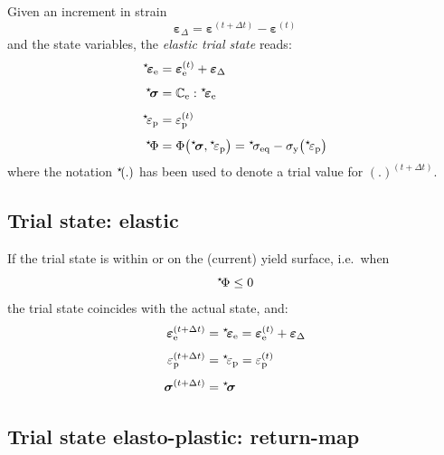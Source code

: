 \documentclass[times,namecite]{goose-article}
\newcommand\leftstar[1]{\hspace*{-.3em}~^\star\!#1}
\begin{document}
Given an increment in strain
\begin{equation}
  \bm{\varepsilon}_\Delta = \bm{\varepsilon}^{(t + \Delta t)} - \bm{\varepsilon}^{(t)}
  \label{eq:strain-increment}
\end{equation}
and the state variables, the \emph{elastic trial state} reads:
\begin{align}
  \leftstar{\bm{\varepsilon}}_\mathrm{e}
  &=
  \bm{\varepsilon}^{(t)}_\mathrm{e} + \bm{\varepsilon}_\Delta \label{eq:trial-strain}
  \\[1ex]
  \leftstar{\bm{\sigma}}
  &=
  \mathbb{C}_\mathrm{e} : \leftstar{\bm{\varepsilon}}_\mathrm{e}
  \\[1ex]
  \leftstar{\varepsilon}_\mathrm{p}
  &=
  \varepsilon_\mathrm{p}^{(t)}
  \\[1ex]
  \leftstar{\Phi}
  &= \Phi \big( \leftstar{\bm{\sigma}} , \leftstar{\varepsilon}_\mathrm{p} \big)
   = \leftstar{\sigma}_\mathrm{eq} - \sigma_\mathrm{y} \big( \leftstar{\varepsilon}_\mathrm{p} \big)
\end{align}
where the notation $\leftstar{(.)}$ has been used to denote a trial value for $(.)^{(t + \Delta t)}$.

\subsection{Trial state: elastic}

If the trial state is within or on the (current) yield surface, i.e.\ when
\begin{equation}
  \leftstar{\Phi} \leq 0
\end{equation}
the trial state coincides with the actual state, and:
\begin{align}
  \bm{\varepsilon}_\mathrm{e}^{(t+\Delta t)}
  &= \leftstar{\bm{\varepsilon}}_\mathrm{e}
   = \bm{\varepsilon}_\mathrm{e}^{(t)} + \bm{\varepsilon}_\Delta
  \\[1ex]
  \varepsilon_\mathrm{p}^{(t+\Delta t)}
  &= \leftstar{\varepsilon}_\mathrm{p}
   = \varepsilon_\mathrm{p}^{(t)}
  \\[1ex]
  \bm{\sigma}^{(t+\Delta t)}
  &= \leftstar{\bm{\sigma}}
\end{align}

\subsection{Trial state elasto-plastic: return-map}
\end{document}
